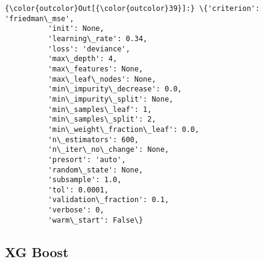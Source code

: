 \documentclass[11pt]{article}
\begin{document}
\begin{Verbatim}[commandchars=\\\{\}]
{\color{outcolor}Out[{\color{outcolor}39}]:} \{'criterion': 'friedman\_mse',
          'init': None,
          'learning\_rate': 0.34,
          'loss': 'deviance',
          'max\_depth': 4,
          'max\_features': None,
          'max\_leaf\_nodes': None,
          'min\_impurity\_decrease': 0.0,
          'min\_impurity\_split': None,
          'min\_samples\_leaf': 1,
          'min\_samples\_split': 2,
          'min\_weight\_fraction\_leaf': 0.0,
          'n\_estimators': 600,
          'n\_iter\_no\_change': None,
          'presort': 'auto',
          'random\_state': None,
          'subsample': 1.0,
          'tol': 0.0001,
          'validation\_fraction': 0.1,
          'verbose': 0,
          'warm\_start': False\}
\end{Verbatim}
            
    \hypertarget{xg-boost}{%
\subsection{XG Boost}\label{xg-boost}}
\end{document}
